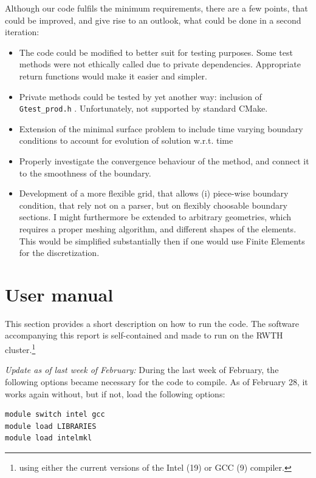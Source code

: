 \documentclass[11pt]{scrartcl}
\begin{document}
Although our code fulfils the minimum requirements, there are a few points, that could be improved, and give rise to an outlook, what could be done in a second iteration:
\begin{itemize}
	\item {The code could be modified to better suit for testing purposes. Some test methods were not ethically called due to private dependencies. Appropriate return functions would make it easier and simpler.}
	\item {Private methods could be tested by yet another way: inclusion of \texttt{Gtest\_prod.h} . Unfortunately, not supported by standard CMake.}
	\item {Extension of the minimal surface problem to include time varying boundary conditions to account for evolution of solution w.r.t. time}
	\item{Properly investigate the convergence behaviour of the method, and connect it to the smoothness of the boundary.}
	\item{Development of a more flexible grid, that allows (i) piece-wise boundary condition, that rely not on a parser, but on flexibly choosable boundary sections. I might furthermore be extended to arbitrary geometries, which requires a proper meshing algorithm, and different shapes of the elements. This would be simplified substantially then if one would use Finite Elements for the discretization.}
\end{itemize}


%


\clearpage
\appendix
\section{User manual}
\small
This section provides a short description on how to run the code. The software accompanying this report is self-contained and made to run on the RWTH cluster.\footnote{using either the current versions of the Intel (19) or GCC (9) compiler.}

\color{@darkred}
\emph{Update as of last week of February:} During the last week of February, the following options became necessary for the code to compile. As of February 28, it works again without, but if not, load the following options:

\begin{lstlisting}
module switch intel gcc 
module load LIBRARIES
module load intelmkl    
\end{lstlisting}
\normalcolor
\end{document}
